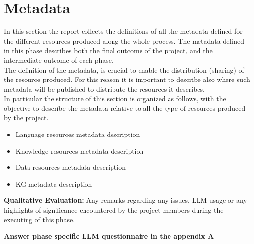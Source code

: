\section{Metadata}

In this section the report collects the definitions of all the metadata defined for the different resources produced along the whole process. The metadata defined in this phase describes both the final outcome of the project, and the intermediate outcome of each phase.\\

\noindent The definition of the metadata, is crucial to enable the distribution (sharing) of the resource produced. For this reason it is important to describe also where such metadata will be published to distribute the resources it describes. \\

\noindent In particular the structure of this section is organized as follows, with the objective to describe the metadata relative to all the type of resources produced by the project.\\
\begin{itemize}
    \item Language resources metadata description
    \item Knowledge resources metadata description
    \item Data resources metadata description
    \item KG metadata description
\end{itemize}

\noindent \textbf{Qualitative Evaluation:} Any remarks regarding any issues, LLM usage or any highlights of significance encountered by the project members during the executing of this phase.

\noindent \textbf{Answer phase specific LLM questionnaire in the appendix A}

